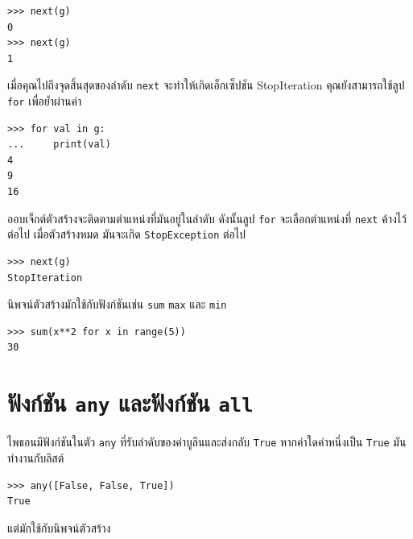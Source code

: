 \begin{verbatim}
>>> next(g)
0
>>> next(g)
1
\end{verbatim}
%
เมื่อคุณไปถึงจุดสิ้นสุดของลำดับ {\tt next} จะทำให้เกิดเอ็กเซ็ปชัน StopIteration คุณยังสามารถใช้ลูป {\tt for} เพื่อย้ำผ่านค่า

\begin{verbatim}
>>> for val in g:
...     print(val)
4
9
16
\end{verbatim}
%
ออบเจ็กต์ตัวสร้างจะติดตามตำแหน่งที่มันอยู่ในลำดับ ดังนั้นลูป {\tt for} จะเลือกตำแหน่งที่ {\tt next} ค้างไว้ต่อไป เมื่อตัวสร้างหมด มันจะเกิด {\tt StopException} ต่อไป

\begin{verbatim}
>>> next(g)
StopIteration
\end{verbatim}

นิพจน์ตัวสร้างมักใช้กับฟังก์ชันเช่น {\tt sum} {\tt max} และ {\tt min}

\begin{verbatim}
>>> sum(x**2 for x in range(5))
30
\end{verbatim}


\section{ฟังก์ชัน {\tt any} และฟังก์ชัน {\tt all}}

ไพธอนมีฟังก์ชันในตัว {\tt any} ที่รับลำดับของค่าบูลีนและส่งกลับ {\tt True} หากค่าใดค่าหนึ่งเป็น {\tt True} มันทำงานกับลิสต์

\begin{verbatim}
>>> any([False, False, True])
True
\end{verbatim}
%
แต่มักใช้กับนิพจน์ตัวสร้าง

